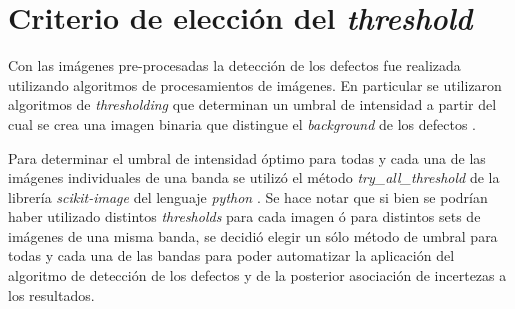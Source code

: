\singlespacing
\section{Criterio de elección del \textit{threshold} \href{https://github.com/jrr1984/defects_analysis/blob/master/MAIN/try_all_thresholds.py}{\faGithub}}

\hspace{0.5cm}Con las imágenes pre-procesadas la detección de los defectos fue realizada utilizando algoritmos de procesamientos de imágenes. En particular se utilizaron algoritmos de \textit{thresholding} que determinan un umbral de intensidad a partir del cual se crea una imagen binaria que distingue el \textit{background} de los defectos \cite{shapi}.

Para determinar el umbral de intensidad óptimo para todas y cada una de las imágenes individuales de una banda se utilizó el método \textit{try\_all\_threshold} de la librería \textit{scikit-image} del lenguaje \textit{python} \cite{van2014scikit}. Se hace notar que si bien se podrían haber utilizado distintos \textit{thresholds} para cada imagen ó para distintos sets de imágenes de una misma banda, se decidió elegir un sólo método de umbral para todas y cada una de las bandas para poder automatizar la aplicación del algoritmo de detección de los defectos y de la posterior asociación de incertezas a los resultados.

